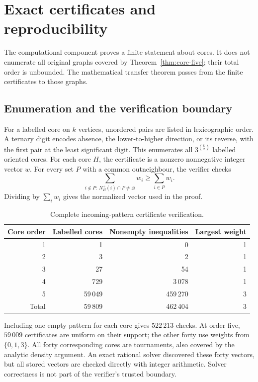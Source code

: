 \section{Exact certificates and reproducibility}\label{sec:paper-verification}
The computational component proves a finite statement about cores. It does
not enumerate all original graphs covered by Theorem~\ref{thm:core-five};
their total order is unbounded. The mathematical transfer theorem passes
from the finite certificates to those graphs.

\subsection{Enumeration and the verification boundary}
For a labelled core on $k$ vertices, unordered pairs are listed in
lexicographic order. A ternary digit encodes absence, the lower-to-higher
direction, or its reverse, with the first pair at the least significant digit.
This enumerates all $3^{\binom{k}{2}}$ labelled oriented cores.
For each core $H$, the certificate is a nonzero nonnegative integer vector $w$.
For every set $P$ with a common outneighbour, the verifier checks
\[
 \sum_{i\notin P:\ N_H^+(i)\cap P\ne\varnothing}w_i
       \ge\sum_{i\in P}w_i.
\]
Dividing by $\sum_iw_i$ gives the normalized vector used in the proof.

\begin{table}[htbp]
\centering
\caption{Complete incoming-pattern certificate verification.}
\label{tab:paper-certificate-counts}
\begin{tabular}{@{}rrrr@{}}
\toprule
Core order & Labelled cores & Nonempty inequalities & Largest weight\\
\midrule
1 & 1 & 0 & 1\\
2 & 3 & 2 & 1\\
3 & 27 & 54 & 1\\
4 & 729 & 3\,078 & 1\\
5 & 59\,049 & 459\,270 & 3\\
\midrule
Total & 59\,809 & 462\,404 & 3\\
\bottomrule
\end{tabular}
\end{table}

Including one empty pattern for each core gives $522\,213$ checks.
At order five, $59\,009$ certificates are uniform on their support;
the other forty use weights from $\{0,1,3\}$. All forty corresponding
cores are tournaments, also covered by the analytic density argument.
An exact rational solver discovered these forty vectors, but all stored
vectors are checked directly with integer arithmetic. Solver correctness
is not part of the verifier's trusted boundary.

